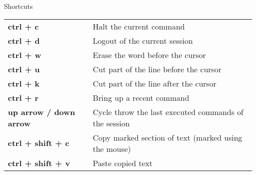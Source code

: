\begin{block}{Shortcuts}%
	\begin{tabular}{p{\bashcolumnsize}p{\desccolumnsize}}
		\textbf{ctrl + c} & Halt the current command\\
		\textbf{ctrl + d} & Logout of the current session\\
		\textbf{ctrl + w} & Erase the word before the cursor\\
		\textbf{ctrl + u} & Cut part of the line before the cursor\\
		\textbf{ctrl + k} & Cut part of the line after the cursor\\
		\textbf{ctrl + r} & Bring up a recent command\\
		\textbf{up arrow / down arrow} & Cycle throw the last executed commands of the session\\
		\textbf{ctrl + shift + c} & Copy marked section of text (marked using the mouse)\\
		\textbf{ctrl + shift + v} & Paste copied text\\
	\end{tabular}
\end{block}
